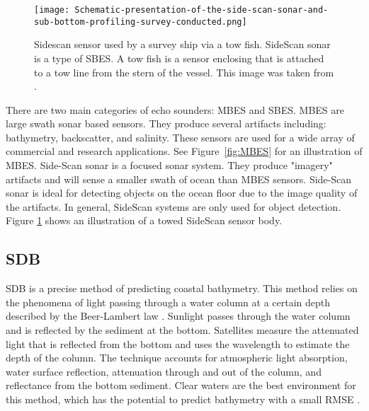 \begin{figure}[htp]
    \centering
    \texttt{[image: Schematic-presentation-of-the-side-scan-sonar-and-sub-bottom-profiling-survey-conducted.png]}
    \caption[Figure depicting a Sidescan echo sounder]{Sidescan sensor used by a survey ship via a tow fish.
    SideScan sonar is a type of \ac{SBES}.
    A tow fish is a sensor enclosing that is attached to a tow line from the stern of the vessel.
    This image was taken from \cite{sakellariou2015preliminary}.}
    \label{fig:sidescandemo}
\end{figure}


There are two main categories of echo sounders: \ac{MBES} and \ac{SBES}.
\ac{MBES} are large swath sonar based sensors.
They produce several artifacts including: bathymetry, backscatter, and salinity.
These sensors are used for a wide array of commercial and research applications.
See Figure~\ref{fig:MBES} for an illustration of \ac{MBES}.
Side-Scan sonar is a focused sonar system.
They produce "imagery" artifacts and will sense a smaller swath of ocean than \ac{MBES} sensors.
Side-Scan sonar is ideal for detecting objects on the ocean floor due to the image quality of the artifacts.
In general, SideScan systems are only used for object detection.
Figure \ref{fig:sidescandemo} shows an illustration of a towed SideScan sensor body.




\subsection{\acf{SDB}}
\ac{SDB} is a precise method of predicting coastal bathymetry. 
This method relies on the phenomena of light passing through a water column at a certain depth described by the Beer-Lambert law \cite{chybicki2018three}\cite{vinayaraj2016satellite}.
Sunlight passes through the water column and is reflected by the sediment at the bottom.
Satellites measure the attenuated light that is reflected from the bottom and uses the wavelength to estimate the depth of the column.
The technique accounts for atmospheric light absorption, water surface reflection, attenuation through and out of the column, and reflectance from the bottom sediment.
Clear waters are the best environment for this method, which has the potential to predict bathymetry with a small RMSE \cite{chybicki2018three}.


